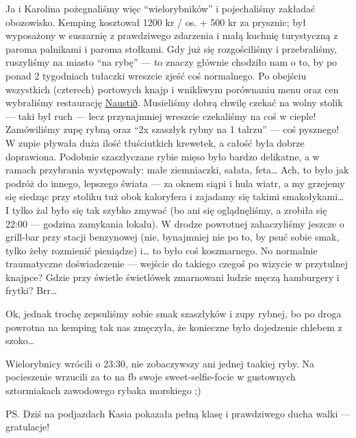 
Ja i Karolina pożegnaliśmy więc “wielorybników” i pojechaliśmy zakładać obozowisko. Kemping kosztował 1200 kr / os. + 500 kr za prysznic; był wyposażony w suszarnię z prawdziwego zdarzenia i małą kuchnię turystyczną z paroma palnikami i paroma stołkami. Gdy już się rozgościliśmy i przebraliśmy, ruszyliśmy na miasto “na rybę” --- to znaczy głównie chodziło nam o to, by po ponad 2 tygodniach tułaczki wreszcie zjeść coś normalnego. Po obejściu wszystkich (czterech) portowych knajp i wnikliwym porównaniu menu oraz cen wybraliśmy restaurację \href{https://www.facebook.com/naustid}{Naustið}. Musieliśmy dobrą chwilę czekać na wolny stolik --- taki był ruch --- lecz przynajmniej wreszcie czekaliśmy na coś w cieple! Zamówiliśmy zupę rybną oraz “2x szaszłyk rybny na 1 talrzu” --- coś pysznego! W zupie pływała duża ilość tłuściutkich krewetek, a całość była dobrze doprawiona. Podobnie szaszłyczane rybie mięso było bardzo delikatne, a w ramach przybrania występowały: małe ziemniaczki, sałata, feta… Ach, to było jak podróż do innego, lepszego świata --- za oknem siąpi i hula wiatr, a my grzejemy się siedząc przy stoliku tuż obok kaloryfera i zajadamy się takimi smakołykami… I tylko żal było się tak szybko zmywać (bo ani się oglądnęliśmy, a zrobiła się 22:00 --- godzina zamykania lokalu). W drodze powrotnej zahaczyliśmy jeszcze o grill-bar przy stacji benzynowej (nie, bynajmniej nie po to, by psuć sobie smak, tylko żeby rozmienić pieniądze) i… to było coś koszmarnego. No normalnie traumatyczne doświadczenie --- wejście do takiego czegoś po wizycie w przytulnej knajpce? Gdzie przy świetle świetlówek zmarnowani ludzie męczą hamburgery i frytki? Brr…

Ok, jednak trochę zepsuliśmy sobie smak szaszłyków i zupy rybnej, bo po droga powrotna na kemping tak nas zmęczyła, że konieczne było dojedzenie chlebem z szoko…

Wielorybnicy wrócili o 23:30, nie zobaczywszy ani jednej taakiej ryby. Na pocieszenie wrzucili za to na fb swoje sweet-selfie-focie w gustownych sztormiakach zawodowego rybaka morskiego ;)

PS. Dziś na podjazdach Kasia pokazała pełną klasę i prawdziwego ducha walki --- gratulacje!
